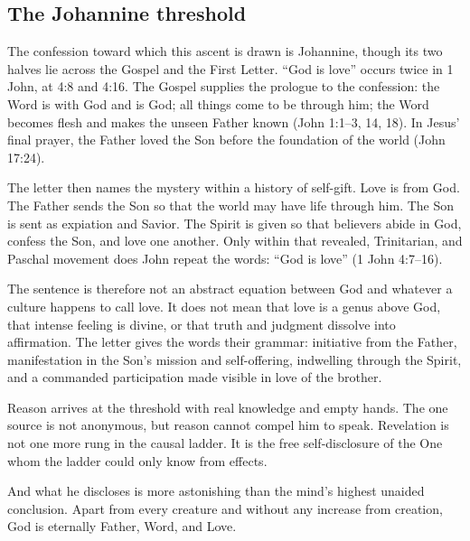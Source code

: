 \subsection{The Johannine threshold}

The confession toward which this ascent is drawn is Johannine, though its two halves lie across the Gospel and the First Letter. ``God is love'' occurs twice in 1 John, at 4:8 and 4:16. The Gospel supplies the prologue to the confession: the Word is with God and is God; all things come to be through him; the Word becomes flesh and makes the unseen Father known (John 1:1--3, 14, 18). In Jesus' final prayer, the Father loved the Son before the foundation of the world (John 17:24).

The letter then names the mystery within a history of self-gift. Love is from God. The Father sends the Son so that the world may have life through him. The Son is sent as expiation and Savior. The Spirit is given so that believers abide in God, confess the Son, and love one another. Only within that revealed, Trinitarian, and Paschal movement does John repeat the words: ``God is love'' (1 John 4:7--16).

The sentence is therefore not an abstract equation between God and whatever a culture happens to call love. It does not mean that love is a genus above God, that intense feeling is divine, or that truth and judgment dissolve into affirmation. The letter gives the words their grammar: initiative from the Father, manifestation in the Son's mission and self-offering, indwelling through the Spirit, and a commanded participation made visible in love of the brother.

Reason arrives at the threshold with real knowledge and empty hands. The one source is not anonymous, but reason cannot compel him to speak. Revelation is not one more rung in the causal ladder. It is the free self-disclosure of the One whom the ladder could only know from effects.

And what he discloses is more astonishing than the mind's highest unaided conclusion. Apart from every creature and without any increase from creation, God is eternally Father, Word, and Love.
